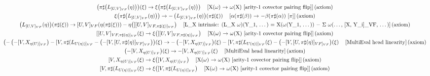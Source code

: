 \documentclass[11pt]{article}
\begin{document}
{\begin{gather*}
\left(\pi\sharp\!\left(L_{[U,V]_{VF}}\!\left(\eta\right)\right)\right)\!\left(\xi\right) \to \xi\!\left(\pi\sharp\!\left(L_{[U,V]_{VF}}\!\left(\eta\right)\right)\right) \quad \text{[X(\ensuremath{\omega}) \ensuremath{\to} \ensuremath{\omega}(X)  [arity-1 covector pairing flip]]\,(axiom)} \\
\xi\!\left(\pi\sharp\!\left(L_{[U,V]_{VF}}\!\left(\eta\right)\right)\right) \to -\left(L_{[U,V]_{VF}}\!\left(\eta\right)\right)\!\left(\pi\sharp\!\left(\xi\right)\right) \quad \text{[\ensuremath{\alpha}(\ensuremath{\pi}\ensuremath{\sharp}(\ensuremath{\beta})) \ensuremath{\to} \ensuremath{-}\ensuremath{\beta}(\ensuremath{\pi}\ensuremath{\sharp}(\ensuremath{\alpha})) [\ensuremath{\pi}]]\,(axiom)} \\
\left(L_{[U,V]_{VF}}\!\left(\eta\right)\right)\!\left(\pi\sharp\!\left(\xi\right)\right) \to [U,V]_{VF}\!\left(\eta\!\left(\pi\sharp\!\left(\xi\right)\right)\right) - \eta\!\left([[U,V]_{VF,\pi\sharp(\xi)]_{VF}}\right) \quad \text{[L\_X intrinsic: (L\_X \ensuremath{\omega})(Y\_1, \ensuremath{\dots}) = X(\ensuremath{\omega}(Y\_1, \ensuremath{\dots})) \ensuremath{-} \ensuremath{\Sigma} \ensuremath{\omega}(\ensuremath{\dots}, [X, Y\_i]\_VF, \ensuremath{\dots})]\,(axiom)} \\
[[U,V]_{VF,\pi\sharp(\eta)]_{VF}}\!\left(\xi\right) \to \xi\!\left([[U,V]_{VF,\pi\sharp(\eta)]_{VF}}\right) \quad \text{[X(\ensuremath{\omega}) \ensuremath{\to} \ensuremath{\omega}(X)  [arity-1 covector pairing flip]]\,(axiom)} \\
\left(-\left(-[V,X_{\eta(U)]_{VF}}\right) - [V,\pi\sharp(L_{U(\eta))]_{VF}} - \left(-[V,[U,\pi\sharp(\eta)]_{VF]_{VF}}\right)\right)\!\left(\xi\right) \to -\left(-[V,X_{\eta(U)]_{VF}}\right)\!\left(\xi\right) - [V,\pi\sharp(L_{U(\eta))]_{VF}}\!\left(\xi\right) - \left(-[V,[U,\pi\sharp(\eta)]_{VF]_{VF}}\right)\!\left(\xi\right) \quad \text{[MultiEval head linearity]\,(axiom)} \\
\left(-[V,X_{\eta(U)]_{VF}}\right)\!\left(\xi\right) \to -[V,X_{\eta(U)]_{VF}}\!\left(\xi\right) \quad \text{[MultiEval head linearity]\,(axiom)} \\
[V,X_{\eta(U)]_{VF}}\!\left(\xi\right) \to \xi\!\left([V,X_{\eta(U)]_{VF}}\right) \quad \text{[X(\ensuremath{\omega}) \ensuremath{\to} \ensuremath{\omega}(X)  [arity-1 covector pairing flip]]\,(axiom)} \\
[V,\pi\sharp(L_{U(\eta))]_{VF}}\!\left(\xi\right) \to \xi\!\left([V,\pi\sharp(L_{U(\eta))]_{VF}}\right) \quad \text{[X(\ensuremath{\omega}) \ensuremath{\to} \ensuremath{\omega}(X)  [arity-1 covector pairing flip]]\,(axiom)} \\

\end{gather*}}
\end{document}
